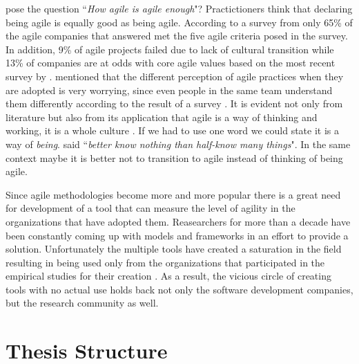 \citet{comparative_agility} pose the question ``\textit{How agile is agile enough}"? Practictioners think that declaring being agile is equally good as being agile. According to a survey from \citet{ambysoft} only 65\% of the agile companies that answered met the five agile criteria posed in the survey. In addition, 9\% of agile projects failed due to lack of cultural transition while 13\% of companies are at odds with core agile values based on the most recent survey by \citet{versionOne}. \citet{poonacha} mentioned that the different perception of agile practices when they are adopted is very worrying, since even people in the same team understand them differently according to the result of a survey \cite{ambler}. It is evident not only from literature but also from its application that agile is a way of thinking and working, it is a whole culture \cite{poonacha}. If we had to use one word we could state it is a way of \textit{being}. \citet{Nietzsche} said ``\textit{better know nothing than half-know many things}". In the same context maybe it is better not to transition to agile instead of thinking of being agile. 

Since agile methodologies become more and more popular there is a great need for development of a tool that can measure the level of agility in the organizations that have adopted them. Reasearchers for more than a decade have been constantly coming up with models and frameworks in an effort to provide a solution. Unfortunately the multiple tools have created a saturation in the field resulting in being used only from the organizations that participated in the empirical studies for their creation \cite{samireh_jalali_dissertation}. As a result, the vicious circle of creating tools with no actual use holds back not only the software development companies, but the research community as well.


\section{Thesis Structure}







